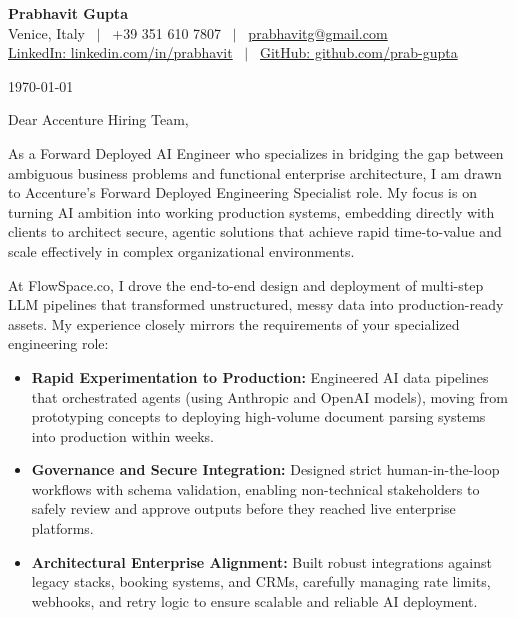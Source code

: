 \documentclass[11pt,a4paper]{article}
\begin{document}
\pagestyle{empty}

\begin{center}
    {\Huge \textbf{Prabhavit Gupta}} \\[0.5em]
    Venice, Italy \ $|$ \ +39 351 610 7807 \ $|$ \ \href{mailto:prabhavitg@gmail.com}{prabhavitg@gmail.com} \\[0.2em]
    \href{https://www.linkedin.com/in/prabhavit/}{LinkedIn: linkedin.com/in/prabhavit} \ $|$ \ \href{https://github.com/prab-gupta}{GitHub: github.com/prab-gupta}
\end{center}

\vspace{1.5em}

\today

\vspace{1em}

\noindent
Dear Accenture Hiring Team,

\vspace{1em}
\noindent
As a Forward Deployed AI Engineer who specializes in bridging the gap between ambiguous business problems and functional enterprise architecture, I am drawn to Accenture's Forward Deployed Engineering Specialist role. My focus is on turning AI ambition into working production systems, embedding directly with clients to architect secure, agentic solutions that achieve rapid time-to-value and scale effectively in complex organizational environments.

\vspace{1em}
\noindent
At FlowSpace.co, I drove the end-to-end design and deployment of multi-step LLM pipelines that transformed unstructured, messy data into production-ready assets. My experience closely mirrors the requirements of your specialized engineering role:

\begin{itemize}
    \item \textbf{Rapid Experimentation to Production:} Engineered AI data pipelines that orchestrated agents (using Anthropic and OpenAI models), moving from prototyping concepts to deploying high-volume document parsing systems into production within weeks.
    \item \textbf{Governance and Secure Integration:} Designed strict human-in-the-loop workflows with schema validation, enabling non-technical stakeholders to safely review and approve outputs before they reached live enterprise platforms.
    \item \textbf{Architectural Enterprise Alignment:} Built robust integrations against legacy stacks, booking systems, and CRMs, carefully managing rate limits, webhooks, and retry logic to ensure scalable and reliable AI deployment.
\end{itemize}
\end{document}
